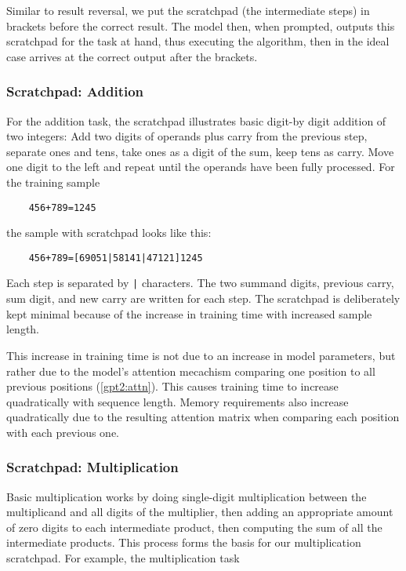 Similar to result reversal, we put the scratchpad (the intermediate steps) in brackets before the correct result. The model then, when prompted, outputs this scratchpad for the task at hand, thus executing the algorithm, then in the ideal case arrives at the correct output after the brackets.

\subsubsection{Scratchpad: Addition}
\label{add_scratchpad}

For the addition task, the scratchpad illustrates basic digit-by digit addition of two integers: Add two digits of operands plus carry from the previous step, separate ones and tens, take ones as a digit of the sum, keep tens as carry. Move one digit to the left and repeat until the operands have been fully processed. For the training sample

\begin{lstlisting}
    456+789=1245
\end{lstlisting}

\noindent
the sample with scratchpad looks like this:

\begin{lstlisting}
    456+789=[69051|58141|47121]1245
\end{lstlisting}

\noindent
Each step is separated by \verb!|! characters. The two summand digits, previous carry, sum digit, and new carry are written for each step.
The scratchpad is deliberately kept minimal because of the increase in training time with increased sample length.

\label{training_time_growth}
This increase in training time is not due to an increase in model parameters, but rather due to the model's attention mecachism comparing one position to all previous positions (\cref{gpt2:attn}). This causes training time to increase quadratically with sequence length. Memory requirements also increase quadratically due to the resulting attention matrix when comparing each position with each previous one.

\subsubsection{Scratchpad: Multiplication}
\label{mul_scratchpad}

Basic multiplication works by doing single-digit multiplication between the multiplicand and all digits of the multiplier, then adding an appropriate amount of zero digits to each intermediate product, then computing the sum of all the intermediate products. This process forms the basis for our multiplication scratchpad. For example, the multiplication task

